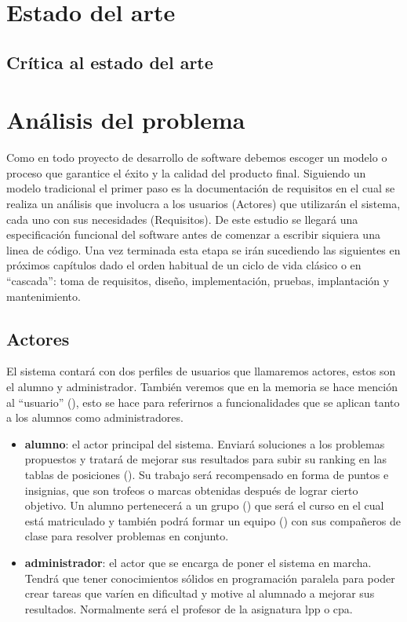 \documentclass[11pt,spanish,listoffigures,listoftables]{tfgetsinf}
\begin{document}
\chapter{Estado del arte}

\section{Crítica al estado del arte}


\chapter{Análisis del problema}

Como en todo proyecto de desarrollo de software debemos escoger un modelo o proceso que garantice el éxito y la calidad del producto final. Siguiendo un modelo tradicional el primer paso es la documentación de requisitos \cite{libingreq} en el cual se realiza un análisis que involucra a los usuarios (Actores) que utilizarán el sistema, cada uno con sus necesidades (Requisitos). De este estudio se llegará una especificación funcional del software antes de comenzar a escribir siquiera una linea de código. Una vez terminada esta etapa se irán sucediendo las siguientes en próximos capítulos dado el orden habitual de un ciclo de vida clásico \cite{libingsoft} o en ``cascada'': toma de requisitos, diseño, implementación, pruebas, implantación y mantenimiento.

\section{Actores}

El sistema contará con dos perfiles de usuarios que llamaremos actores, estos son el \Gls{alumno} y \Gls{administrador}. También veremos que en la memoria se hace mención al ``usuario'' (), esto se hace para referirnos a funcionalidades que se aplican tanto a los \gls{alumno}s como \gls{administrador}es.

\begin{itemize}
	\item \textbf{\gls{alumno}}: el actor principal del sistema. Enviará soluciones a los problemas propuestos y tratará de mejorar sus resultados para subir su ranking en las tablas de posiciones (). Su trabajo será recompensado en forma de puntos e insignias, que son trofeos o marcas obtenidas después de lograr cierto objetivo. Un alumno pertenecerá a un \gls{grupo} () que será el curso en el cual está matriculado y también podrá formar un \gls{equipo} () con sus compañeros de clase para resolver problemas en conjunto.
	\item \textbf{\gls{administrador}}: el actor que se encarga de poner el sistema en marcha. Tendrá que tener conocimientos sólidos en programación paralela para poder crear \gls{tarea}s que varíen en dificultad y motive al alumnado a mejorar sus resultados. Normalmente será el profesor de la asignatura \acrshort{lpp} o \acrshort{cpa}.
\end{itemize}
\end{document}
